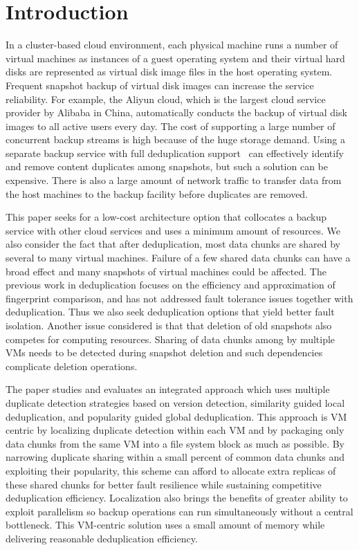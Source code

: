 \section{Introduction}
In a cluster-based cloud environment,
each physical machine runs a number  of virtual machines as  instances of a guest operating system 
and their  virtual hard disks are represented as virtual disk image files in the host operating system.
Frequent  snapshot backup of virtual disk images  can increase  the service reliability. 
For example, the Aliyun cloud, which is  the largest cloud service provider by Alibaba in China, 
automatically conducts  the backup of virtual disk images to all active users every day.
The cost of supporting a large number of concurrent backup streams is high
because of the huge storage demand. 
Using a separate  backup service with full deduplication support~\cite{venti02,bottleneck08}
can effectively identify and remove content duplicates among snapshots, 
but such a solution can be expensive. There is also a large amount of 
network traffic to transfer  data from the host machines to the backup facility
before duplicates are removed.

This paper seeks for a low-cost architecture option  that collocates
a backup service with other cloud services and  uses a minimum amount of resources. 
We also consider the fact that after
deduplication, most data chunks are shared by several to many virtual machines.
Failure of a few shared data chunks can have a 
broad effect and many
snapshots of virtual machines could be affected.
The previous work in deduplication focuses on the efficiency and approximation of
fingerprint comparison, and has not addressed fault tolerance issues  together with deduplication.
Thus we also seek deduplication options that yield better fault isolation.
Another issue considered is that
that deletion of old snapshots also competes for computing resources. 
Sharing of data chunks among by multiple VMs needs to be detected during
snapshot   deletion and such dependencies complicate deletion operations. 

The paper studies and evaluates  an integrated approach which uses  multiple duplicate detection strategies
based on  version  detection, similarity guided local deduplication,
and popularity guided global deduplication. 
This approach is VM centric by localizing duplicate detection within each VM  
and by packaging only data chunks from the same VM into a file system block as much as possible.
By narrowing duplicate sharing within a small percent of common data chunks and exploiting their popularity,
this scheme can afford to allocate extra replicas of these shared chunks for better
fault resilience while sustaining competitive deduplication efficiency.
Localization also brings the benefits of greater ability to exploit parallelism so
backup operations can run simultaneously without a central  bottleneck.
This  VM-centric solution uses  a small amount of  memory while delivering reasonable deduplication efficiency. 

